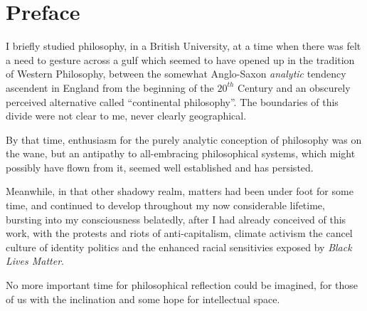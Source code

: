 \chapter*{Preface}

I briefly studied philosophy, in a British University, at a time when there was felt a need to gesture across a gulf which seemed to have opened up in the tradition of Western Philosophy, between the somewhat Anglo-Saxon {\it analytic} tendency ascendent in England from the beginning of the $20^{th}$ Century and an obscurely perceived alternative called ``continental philosophy''.
The boundaries of this divide were not clear to me, never clearly geographical.

By that time, enthusiasm for the purely analytic conception of philosophy  was on the wane, but an antipathy to all-embracing philosophical systems, which might possibly have flown from it, seemed well established and has persisted.

Meanwhile, in that other shadowy realm, matters had been under foot for some time, and continued to develop throughout my now considerable lifetime, bursting into my consciousness belatedly, after I had already conceived of this work, with the protests and riots of anti-capitalism, climate activism the cancel culture of identity politics and the enhanced racial sensitivies exposed by {\em Black Lives Matter}.

No more important time for philosophical reflection could be imagined, for those of us with the inclination and some hope for intellectual space.
